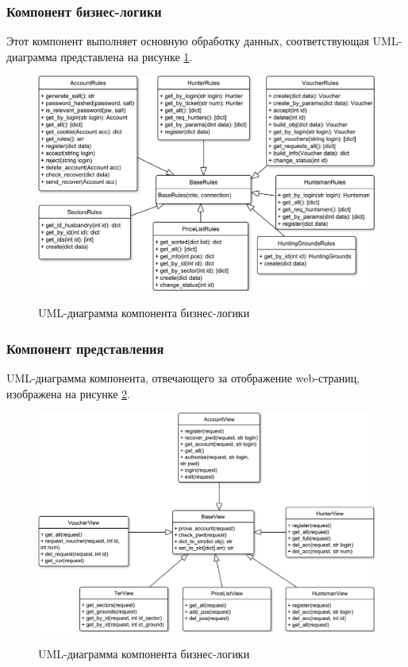 		\subsubsection{Компонент бизнес-логики}
		Этот компонент выполняет основную обработку данных, соответствующая UML-диаграмма представлена на рисунке \ref{fig7:image}.
		
		\begin{figure}[ph!]
			\centering
			\begin{center}
				{\includegraphics[scale=0.6]{schemes/uml_business.pdf}}
				\caption{UML-диаграмма компонента бизнес-логики}
				\label{fig7:image}
			\end{center}
		\end{figure}
	
		\subsubsection{Компонент представления}
		UML-диаграмма компонента, отвечающего за отображение web-страниц, изображена на рисунке \ref{fig8:image}.
		
		\begin{figure}[pt!]
			\centering
			\begin{center}
				{\includegraphics[scale=0.6]{schemes/webGUI.pdf}}
				\caption{UML-диаграмма компонента бизнес-логики}
				\label{fig8:image}
			\end{center}
		\end{figure}
		\newpage
	
